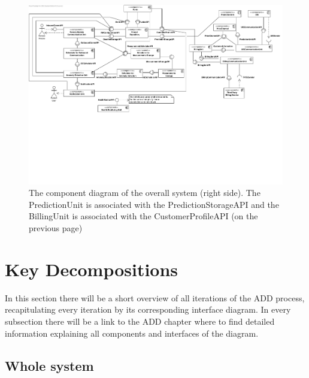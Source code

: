 \begin{figure}[H]
	\begin{centering}
		\includegraphics[height=\textwidth,angle=-90]{figs/right-final-component.pdf}
		\caption{The component diagram of the overall system (right side). The
		PredictionUnit is associated with the PredictionStorageAPI  and the BillingUnit is associated with
		the CustomerProfileAPI (on the previous page)}
		\label{fig:final-components-right}
	\end{centering}
\end{figure}

\section{Key Decompositions}

\npar In this section there will be a short overview of all iterations of the
ADD process, recapitulating every iteration by its corresponding interface
diagram. In every subsection there will be a link to the ADD chapter where to
find detailed information explaining all components and interfaces of the
diagram.

\subsection{Whole system}

